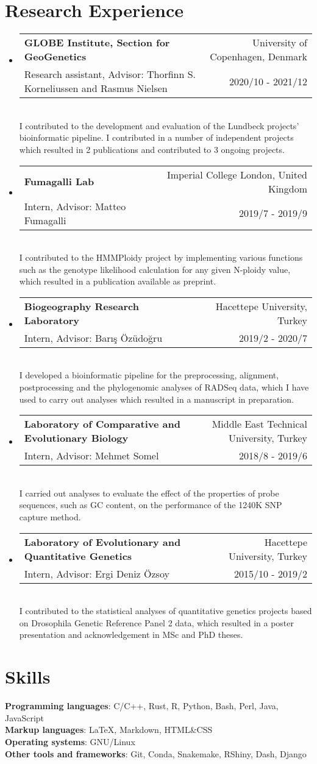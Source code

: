 \documentclass[letterpaper,10.5pt]{article}
\makeatletter
\newcommand{\resumeSubheading}[5]{
  \vspace{-1pt}\item
    \begin{tabular*}{0.97\textwidth}{l@{\extracolsep{\fill}}r}
      \textbf{#1} & #2 \\
      {\small#3} & {\small #4} \\
    \end{tabular*}\vspace{3pt} \\
    #5
}
\newcommand{\resumeSubHeadingListStart}{\begin{itemize}[leftmargin=*]}
\newcommand{\resumeSubHeadingListEnd}{\end{itemize}}
\makeatother
\begin{document}
\section{Research Experience}
  \resumeSubHeadingListStart

    \resumeSubheading
      {GLOBE Institute, Section for GeoGenetics}{University of Copenhagen, Denmark}
      {Research assistant, Advisor: Thorfinn S. Korneliussen and Rasmus Nielsen}{2020/10 - 2021/12}
      {I contributed to the development and evaluation of the Lundbeck projects' bioinformatic pipeline. I contributed in a number of independent projects which resulted in 2 publications and contributed to 3 ongoing projects.}
    \medskip
    
    
    \resumeSubheading
      {Fumagalli Lab}{Imperial College London, United Kingdom}
      {Intern, Advisor: Matteo Fumagalli}{2019/7 - 2019/9}
      {I contributed to the HMMPloidy project by implementing various functions such as the genotype likelihood calculation for any given N-ploidy value, which resulted in a publication available as preprint.}
    \medskip


    \resumeSubheading
      {Biogeography Research Laboratory}{Hacettepe University, Turkey}
      {Intern, Advisor: Bar{\i}\c{s} \"{O}z\"{u}do\u{g}ru}{2019/2 - 2020/7}
      {I developed a bioinformatic pipeline for the preprocessing, alignment, postprocessing and the phylogenomic analyses of RADSeq data, which I have used to carry out analyses which resulted in a manuscript in preparation.}
    \medskip
 
    \resumeSubheading
      {Laboratory of Comparative and Evolutionary Biology}{Middle East Technical University, Turkey}
      {Intern, Advisor: Mehmet Somel}{2018/8 - 2019/6}
      {I carried out analyses to evaluate the effect of the properties of probe sequences, such as GC content, on the performance of the 1240K SNP capture method.}

    \medskip


    \resumeSubheading
      {Laboratory of Evolutionary and Quantitative Genetics}{Hacettepe University, Turkey}
      {Intern, Advisor: Ergi Deniz \"{O}zsoy}{2015/10 - 2019/2}
      {I contributed to the statistical analyses of quantitative genetics projects based on Drosophila Genetic Reference Panel 2 data, which resulted in a poster presentation and acknowledgement in MSc and PhD theses.}
  \resumeSubHeadingListEnd
  


\section{Skills}
\textbf{Programming languages}: C/C++, Rust, R, Python, Bash, Perl, Java, JavaScript \\
\textbf{Markup languages}: \LaTeX, Markdown, HTML\&CSS \\
\textbf{Operating systems}: GNU/Linux \\
\textbf{Other tools and frameworks}: Git, Conda, Snakemake, RShiny, Dash, Django \\
\end{document}
